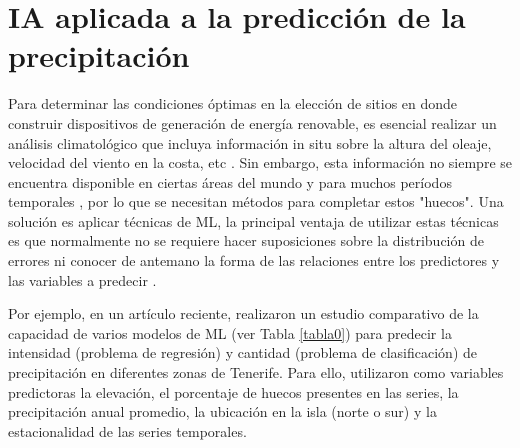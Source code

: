 \documentclass[12pt]{article}
\begin{document}
\section{IA aplicada a la predicción de la precipitación}

Para determinar las condiciones óptimas en la elección de sitios en donde construir dispositivos de generación de energía renovable, es esencial realizar un análisis climatológico que incluya información in situ sobre la altura del oleaje, velocidad del viento en la costa, etc \citep{ Nkiaka, Hasan, Wang,Li,Li2}. Sin embargo, esta información no siempre se encuentra disponible en ciertas áreas del mundo y para muchos períodos temporales \citep{Buytaert}, por lo que se necesitan métodos para completar estos "huecos". Una solución es aplicar técnicas de ML, la principal ventaja de utilizar estas técnicas es que normalmente no se requiere hacer suposiciones sobre la distribución de errores ni conocer de antemano la forma de las relaciones entre los predictores y las variables a predecir \citep{Manuel}.

Por ejemplo, en un artículo reciente, \citet{Manuel} realizaron un estudio comparativo de la capacidad de varios modelos de ML (ver Tabla \ref{tabla0}) para predecir la intensidad (problema de regresión) y cantidad (problema de clasificación) de precipitación en diferentes zonas de Tenerife. Para ello, utilizaron como variables predictoras la elevación, el porcentaje de huecos presentes en las series, la precipitación anual promedio, la ubicación en la isla (norte o sur) y la estacionalidad de las series temporales.
\end{document}
